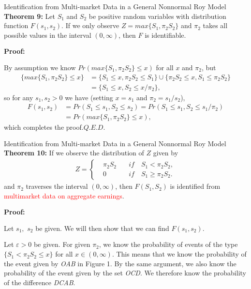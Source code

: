 \documentclass{beamer}
\begin{document}
\begin{frame}{Identification from Multi-market Data in a General Nonnormal Roy Model}
	\textbf{Theorem 9:}  Let $S_1$ and $S_2$ be positive random variables with distribution function $F(s_1,s_2)$. If we only observe $Z=max\{S_1,\pi_2 S_2\}$ and $\pi_2$ takes all possible values in the interval $(0,\infty)$, then $F$ is identifiable.

\bigskip
	\textbf{Proof:}
	
	By assumption we know $Pr(max\{S_1,\pi_2 S_2\}\leq x)$ for all $x$ and $\pi_2$, but
	\begin{equation}\nonumber
	\begin{aligned}
		\{max\{S_1,\pi_2S_2\}\leq x\}&=\{S_1\leq x,\pi_2S_2\leq S_1\}\cup \{\pi_2S_2\leq x,S_1\leq \pi_2S_2\} \\
		&=\{S_1\leq x,S_2\leq x/\pi_2\},
	\end{aligned}
	\end{equation}
so for any $s_1,s_2>0$ we have (setting $x=s_1$ and $\pi_2=s_1/s_2$),
	\begin{equation}\nonumber
	\begin{aligned}
	F(s_1,s_2)&=Pr(S_1\leq s_1,S_2\leq s_2)=Pr(S_1\leq s_1,S_2\leq s_1/\pi_2)\\
	&=Pr(max\{S_1,\pi_2S_2\}\leq x),
	\end{aligned}
	\end{equation}
which completes the proof.\hfill $Q.E.D.$
\end{frame}


\begin{frame}{Identification from Multi-market Data in a General Nonnormal Roy Model}
\textbf{Theorem 10:}  If we observe the distribution of $Z$ given by
	\begin{align}\nonumber
		Z=\left\{
		\begin{aligned}
		&\pi_2S_2\quad &if \quad S_1<\pi_2S_2,\\
		&0 \quad &if \quad S_1\geq \pi_2S_2.
		\end{aligned}\right.
	\end{align}
and $\pi_2$ traverses the interval $(0,\infty)$, then $F(S_1,S_2)$ is identified from \textcolor{red}{multimarket data on aggregate earnings}.

\bigskip
\textbf{Proof:}

Let $s_1,$ $s_2$ be given. We will then show that we can find $F(s_1,s_2)$.

Let $\varepsilon>0$ be given. For given $\pi_2$, we know the probability of events of the type $\{S_1<\pi_2S_2\leq x\}$ for all $x\in (0,\infty)$. This means that we know the probability of the event given by \emph{OAB} in Figure 1. By the same argument, we also know the probability of the event given by the set \emph{OCD}. We therefore know the probability of the difference \emph{DCAB}.
\end{frame}
\end{document}
